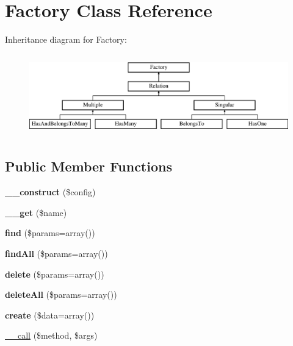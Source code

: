 \hypertarget{classFactory}{
\section{Factory Class Reference}
\label{classFactory}
}
Inheritance diagram for Factory:\begin{figure}[H]
\begin{center}
\leavevmode
\includegraphics[height=3.589744cm]{classFactory}
\end{center}
\end{figure}
\subsection*{Public Member Functions}
\begin{DoxyCompactItemize}
\item 
\hypertarget{classFactory_ae556c241c08efe34785756099a09111d}{
{\bfseries \_\-\_\-construct} (\$config)}
\label{classFactory_ae556c241c08efe34785756099a09111d}

\item 
\hypertarget{classFactory_a5de994669dcdf5e3549b7ca12cd80cf7}{
{\bfseries \_\-\_\-get} (\$name)}
\label{classFactory_a5de994669dcdf5e3549b7ca12cd80cf7}

\item 
\hypertarget{classFactory_acf152c601f0095a766bbca09052a2952}{
{\bfseries find} (\$params=array())}
\label{classFactory_acf152c601f0095a766bbca09052a2952}

\item 
\hypertarget{classFactory_a01ee492a6d9834fb054748720fd67ec1}{
{\bfseries findAll} (\$params=array())}
\label{classFactory_a01ee492a6d9834fb054748720fd67ec1}

\item 
\hypertarget{classFactory_a611490acf3f63055ff936082ed42ffb6}{
{\bfseries delete} (\$params=array())}
\label{classFactory_a611490acf3f63055ff936082ed42ffb6}

\item 
\hypertarget{classFactory_a2f704084a1c34d5e2ec543f41e394099}{
{\bfseries deleteAll} (\$params=array())}
\label{classFactory_a2f704084a1c34d5e2ec543f41e394099}

\item 
\hypertarget{classFactory_a6ddcb04de04ed3a2605c64d0a42c7612}{
{\bfseries create} (\$data=array())}
\label{classFactory_a6ddcb04de04ed3a2605c64d0a42c7612}

\item 
\hyperlink{classFactory_a3c94b769a777ff2b47073eca91750c9f}{\_\-\_\-call} (\$method, \$args)
\end{DoxyCompactItemize}
